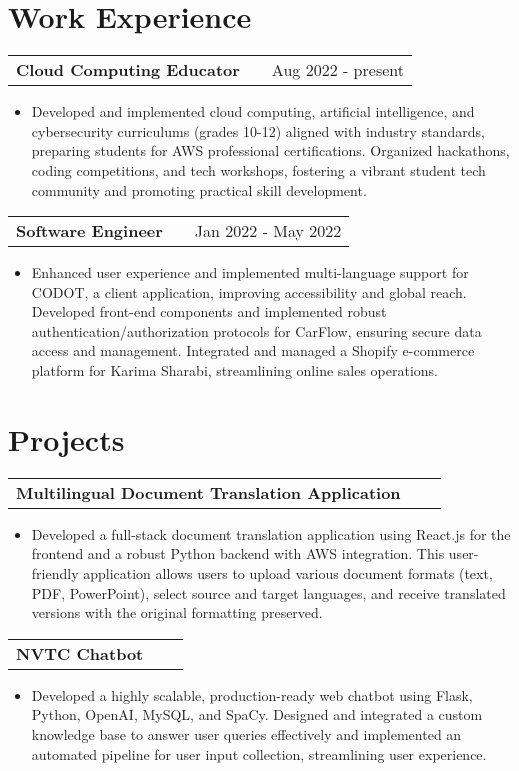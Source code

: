 \documentclass[a4paper,12pt]{article}
\makeatletter
\newenvironment{joblong}[2]
    {
    \begin{tabularx}{\linewidth}{@{}l X r@{}}
    \textbf{#1} & \hfill &  #2 \\[3.75pt]
    \end{tabularx}
    \begin{minipage}[t]{\linewidth}
    \begin{itemize}[nosep,after=\strut, leftmargin=1em, itemsep=3pt,label=--]
    }
    {
    \end{itemize}
    \end{minipage}    
    }
\newenvironment{projectlong}[2]
    {
    \begin{tabularx}{\linewidth}{@{}l X r@{}}
    \textbf{#1} & \hfill &  #2 \\[3.75pt]
    \end{tabularx}
    \begin{minipage}[t]{\linewidth}
    \begin{itemize}[nosep,after=\strut, leftmargin=1em, itemsep=3pt,label=--]
    }
    {
    \end{itemize}
    \end{minipage}    
    }
\makeatother
\begin{document}
\section{Work Experience}

\begin{joblong}{Cloud Computing Educator}{Aug 2022 - present}
\item Developed and implemented cloud computing, artificial intelligence, and cybersecurity curriculums (grades 10-12) aligned with industry standards, preparing students for AWS professional certifications. Organized hackathons, coding competitions, and tech workshops, fostering a vibrant student tech community and promoting practical skill development.
\end{joblong}

\begin{joblong}{Software Engineer}{Jan 2022 - May 2022}
    \item Enhanced user experience and implemented multi-language support for CODOT, a client application, improving accessibility and global reach. Developed front-end components and implemented robust authentication/authorization protocols for CarFlow, ensuring secure data access and management. Integrated and managed a Shopify e-commerce platform for Karima Sharabi, streamlining online sales operations.
\end{joblong}
  
\section{Projects}

\begin{projectlong}{Multilingual Document Translation Application}{}
    \item Developed a full-stack document translation application using React.js for the frontend and a robust Python backend with AWS integration. This user-friendly application allows users to upload various document formats (text, PDF, PowerPoint), select source and target languages, and receive translated versions with the original formatting preserved.
\end{projectlong}

\begin{projectlong}{NVTC Chatbot}{}
    \item Developed a highly scalable, production-ready web chatbot using Flask, Python, OpenAI, MySQL, and SpaCy. Designed and integrated a custom knowledge base to answer user queries effectively and implemented an automated pipeline for user input collection, streamlining user experience.
\end{projectlong}
\end{document}
